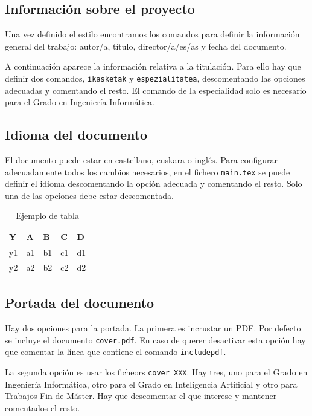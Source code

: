 \subsection{Información sobre el proyecto}

Una vez definido el estilo encontramos los comandos para definir la información general del trabajo: autor/a, título, director/a/es/as y fecha del documento.

A continuación aparece la información relativa a la titulación. Para ello hay que definir dos comandos, \texttt{ikasketak} y \texttt{espezialitatea}, descomentando las opciones adecuadas y comentando el resto. El comando de la especialidad solo es necesario para el Grado en Ingeniería Informática.

\subsection{Idioma del documento}

El documento puede estar en castellano, euskara o inglés. Para configurar adecuadamente todos los cambios necesarios, en el fichero \texttt{main.tex} se puede definir el idioma descomentando la opción adecuada y comentando el resto. Solo una de las opciones debe estar descomentada.

\begin{table}[t]
	\centering
	\begin{tabular}{l|llll}
		Y  & A  & B  & C  & D  \\
		\hline
		y1 & a1 & b1 & c1 & d1 \\
		y2 & a2 & b2 & c2 & d2 \\
	\end{tabular}
	\caption {Ejemplo de tabla}\label{tab:ejemplo}
\end{table}

\subsection{Portada del documento}

Hay dos opciones para la portada. La primera es incrustar un PDF. Por defecto se incluye el documento \texttt{cover.pdf}. En caso de querer desactivar esta opción hay que comentar la línea que contiene el comando \texttt{includepdf}.

La segunda opción es usar los ficheors \texttt{cover\_XXX}. Hay tres, uno para el Grado en Ingeniería Informática, otro para el Grado en Inteligencia Artificial y otro para Trabajos Fin de Máster. Hay que descomentar el que interese y mantener comentados el resto.

